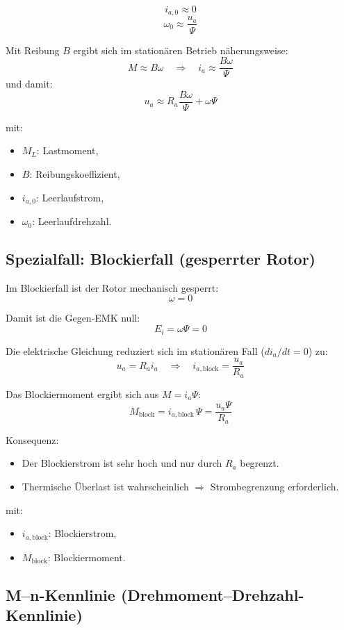 \[
\boxed{i_{a,0} \approx 0}
\]
\[
\boxed{\omega_0 \approx \frac{u_a}{\Psi}}
\]

Mit Reibung $B$ ergibt sich im stationären Betrieb näherungsweise:
\[
M \approx B\omega
\quad\Rightarrow\quad
i_a \approx \frac{B\omega}{\Psi}
\]
und damit:
\[
\boxed{u_a \approx R_a\frac{B\omega}{\Psi} + \omega\Psi}
\]

mit:
\begin{itemize}
\item $M_L$: Lastmoment,
\item $B$: Reibungskoeffizient,
\item $i_{a,0}$: Leerlaufstrom,
\item $\omega_0$: Leerlaufdrehzahl.
\end{itemize}
\subsection{Spezialfall: Blockierfall (gesperrter Rotor)}

Im Blockierfall ist der Rotor mechanisch gesperrt:
\[
\boxed{\omega = 0}
\]

Damit ist die Gegen-EMK null:
\[
\boxed{E_i = \omega\Psi = 0}
\]

Die elektrische Gleichung reduziert sich im stationären Fall ($di_a/dt=0$) zu:
\[
\boxed{u_a = R_a i_a}
\quad\Rightarrow\quad
\boxed{i_{a,\mathrm{block}} = \frac{u_a}{R_a}}
\]

Das Blockiermoment ergibt sich aus $M=i_a\Psi$:
\[
\boxed{M_{\mathrm{block}} = i_{a,\mathrm{block}}\,\Psi = \frac{u_a\Psi}{R_a}}
\]

Konsequenz:
\begin{itemize}
\item Der Blockierstrom ist sehr hoch und nur durch $R_a$ begrenzt.
\item Thermische Überlast ist wahrscheinlich $\Rightarrow$ Strombegrenzung erforderlich.
\end{itemize}

mit:
\begin{itemize}
\item $i_{a,\mathrm{block}}$: Blockierstrom,
\item $M_{\mathrm{block}}$: Blockiermoment.
\end{itemize}
\subsection{M--n-Kennlinie (Drehmoment--Drehzahl-Kennlinie)}


